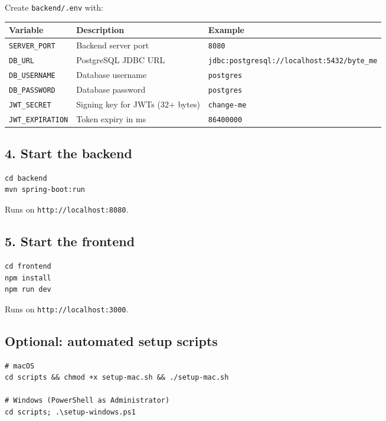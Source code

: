 \documentclass[a4paper,11pt]{article}
\begin{document}
Create \texttt{backend/.env} with:

{\small
\begin{longtable}{l l l}
\toprule
Variable & Description & Example \\
\midrule
\texttt{SERVER\_PORT} & Backend server port & \texttt{8080} \\
\texttt{DB\_URL} & PostgreSQL JDBC URL & \texttt{jdbc:postgresql://localhost:5432/byte\_me} \\
\texttt{DB\_USERNAME} & Database username & \texttt{postgres} \\
\texttt{DB\_PASSWORD} & Database password & \texttt{postgres} \\
\texttt{JWT\_SECRET} & Signing key for JWTs (32+ bytes) & \texttt{change-me} \\
\texttt{JWT\_EXPIRATION} & Token expiry in ms & \texttt{86400000} \\
\bottomrule
\end{longtable}
}

\subsection{4. Start the backend}

\begin{lstlisting}
cd backend
mvn spring-boot:run
\end{lstlisting}

Runs on \texttt{http://localhost:8080}.

\subsection{5. Start the frontend}

\begin{lstlisting}
cd frontend
npm install
npm run dev
\end{lstlisting}

Runs on \texttt{http://localhost:3000}.

\subsection{Optional: automated setup scripts}

\begin{lstlisting}
# macOS
cd scripts && chmod +x setup-mac.sh && ./setup-mac.sh

# Windows (PowerShell as Administrator)
cd scripts; .\setup-windows.ps1
\end{lstlisting}
\end{document}
